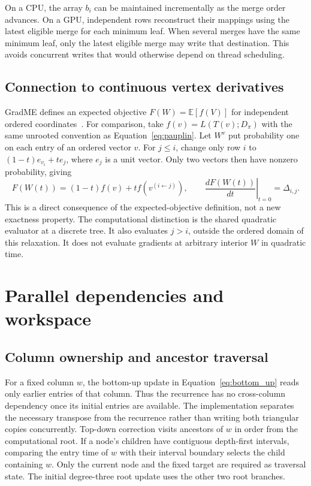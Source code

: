 On a CPU, the array $b_i$ can be maintained incrementally as the merge order advances.
On a GPU, independent rows reconstruct their mappings using the latest eligible merge for each minimum leaf.
When several merges have the same minimum leaf, only the latest eligible merge may write that destination.
This avoids concurrent writes that would otherwise depend on thread scheduling.

\subsection{Connection to continuous vertex derivatives}
\label{sec:vertex_gradient}

GradME defines an expected objective $F(W)=\mathbb E[f(V)]$ for independent ordered coordinates~\cite{penn2023gradme}.
For comparison, take $f(v)=L(T(v);D_\pi)$ with the same unrooted convention as Equation~\eqref{eq:pauplin}.
Let $W^v$ put probability one on each entry of an ordered vector $v$.
For $j\leq i$, change only row $i$ to $(1-t)e_{v_i}+t e_j$, where $e_j$ is a unit vector.
Only two vectors then have nonzero probability, giving
\begin{equation}
 F(W(t))=(1-t)f(v)+t f(v^{(i\leftarrow j)}),\qquad
 \left.\frac{dF(W(t))}{dt}\right|_{t=0}=\Delta_{i,j}.
 \label{eq:vertex_gradient}
\end{equation}
This is a direct consequence of the expected-objective definition, not a new exactness property.
The computational distinction is the shared quadratic evaluator at a discrete tree.
It also evaluates $j>i$, outside the ordered domain of this relaxation.
It does not evaluate gradients at arbitrary interior $W$ in quadratic time.

\section{Parallel dependencies and workspace}
\label{sec:parallel_details}

\subsection{Column ownership and ancestor traversal}

For a fixed column $w$, the bottom-up update in Equation~\eqref{eq:bottom_up} reads only earlier entries of that column.
Thus the recurrence has no cross-column dependency once its initial entries are available.
The implementation separates the necessary transpose from the recurrence rather than writing both triangular copies concurrently.
Top-down correction visits ancestors of $w$ in order from the computational root.
If a node's children have contiguous depth-first intervals, comparing the entry time of $w$ with their interval boundary selects the child containing $w$.
Only the current node and the fixed target are required as traversal state.
The initial degree-three root update uses the other two root branches.

